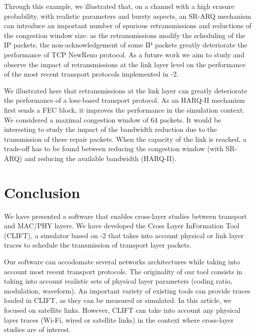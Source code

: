 \documentclass[conference,letterpaper]{IEEEtran}
\begin{document}
Through this example, we illustrated that, on a channel with a high erasure probability, with realistic parameters and bursty aspects, an SR-ARQ mechanism can introduce an important number of spurious retransmissions and reductions of the congestion window size: as the retransmissions modify the scheduling of the IP packets, the non-acknowledgement of some IP packets greatly deteriorate the performance of TCP NewReno protocol. As a future work we aim to study and observe the impact of retransmissions at the link layer level on the performance of the most recent transport protocols implemented in -2.

We illustrated here that retransmissions at the link layer can greatly deteriorate the performance of a loss-based transport protocol. As an HARQ-II mechanism first sends a FEC block, it improves the performance in the simulation context. We considered a maximal congestion window of 64 packets. It would be interesting to study the impact of the bandwidth reduction due to the transmission of these repair packets. When the capacity of the link is reached, a trade-off has to be found between reducing the congestion window (with SR-ARQ) and reducing the available bandwidth (HARQ-II).







\section{Conclusion}
\label{sec::conclusion}



We have presented a software that enables cross-layer studies between transport and MAC/PHY layers. We have developed the Cross Layer InFormation Tool (CLIFT), a simulator based on -2 that takes into account physical or link layer traces to schedule the transmission of transport layer packets. 

Our software can accodomate several networks architectures while taking into account most recent transport protocols. The originality of our tool consists in taking into account realistic sets of physical layer parameters (coding ratio, modulation, waveform). An important variety of existing tools can provide traces loaded in CLIFT, as they can be measured or simulated. 
In this article, we focused on satellite links. However, CLIFT can take into account any physical layer traces (Wi-Fi, wired or satellite links) in the context where cross-layer studies are of interest. 
\end{document}
